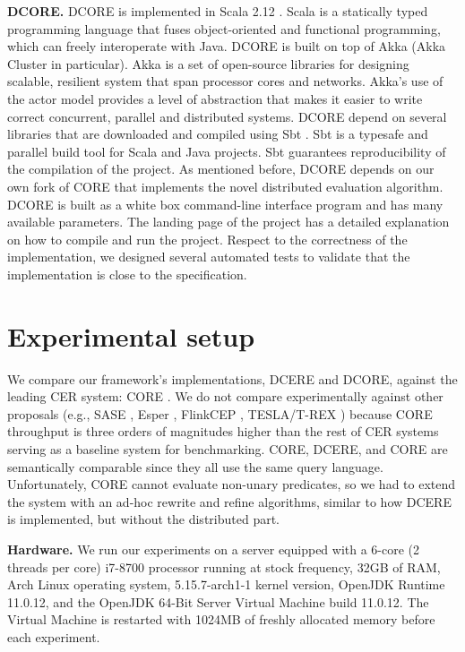 \textbf{DCORE.} DCORE is implemented in Scala 2.12 \cite{scala}. Scala \cite{scala} is a statically typed programming language that fuses object-oriented and functional programming, which can freely interoperate with Java. DCORE is built on top of Akka \cite{akka} (Akka Cluster in particular). Akka is a set of open-source libraries for designing scalable, resilient system that span processor cores and networks. Akka’s use of the actor model provides a level of abstraction that makes it easier to write correct concurrent, parallel and distributed systems. DCORE depend on several libraries that are downloaded and compiled using Sbt \cite{sbt}. Sbt is a typesafe and parallel build tool for Scala and Java projects. Sbt guarantees reproducibility of the compilation of the project. As mentioned before, DCORE depends on our own fork of CORE that implements the novel distributed evaluation algorithm. DCORE is built as a white box command-line interface program and has many available parameters. The landing page of the project has a detailed explanation on how to compile and run the project. Respect to the correctness of the implementation, we designed several automated tests to validate that the implementation is close to the specification.

\section{Experimental setup}\label{sec:setup}

We compare our framework's implementations, DCERE and DCORE, against the leading CER system: CORE \cite{core}.
We do not compare experimentally against other proposals (e.g., SASE \cite{sase}, Esper \cite{esper}, FlinkCEP \cite{flink-cep}, TESLA/T-REX \cite{tesla}) because CORE throughput is three orders of magnitudes higher than the rest of CER systems serving as a baseline system for benchmarking. CORE, DCERE, and CORE are semantically comparable since they all use the same query language. Unfortunately, CORE cannot evaluate non-unary predicates, so we had to extend the system with an ad-hoc rewrite and refine algorithms, similar to how DCERE is implemented, but without the distributed part.

\textbf{Hardware.} We run our experiments on a server equipped with a 6-core (2 threads per core) i7-8700 processor running at stock frequency, 32GB of RAM, Arch Linux operating system, 5.15.7-arch1-1 kernel version, OpenJDK Runtime 11.0.12, and the OpenJDK 64-Bit Server Virtual Machine build 11.0.12. The Virtual Machine is restarted with 1024MB of freshly allocated memory before each experiment.

